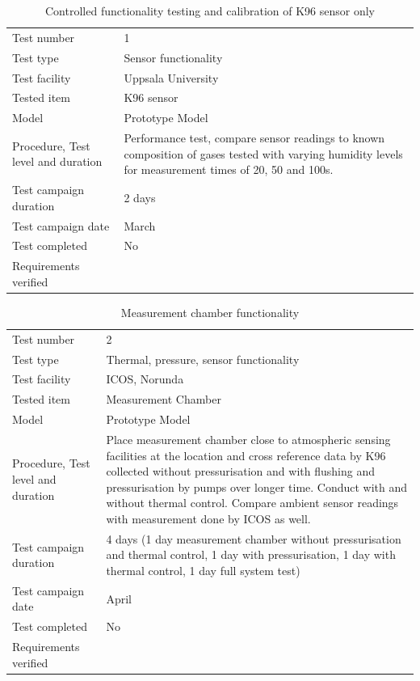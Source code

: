 \documentclass[12pt,a4paper]{report}
\begin{document}
\begin{table}[h]
\centering
\caption{Controlled functionality testing and calibration of K96 sensor only}
\label{tab:test1}
\begin{tabular}{L{5cm}L{10cm}}
\toprule
Test number & 1 \\
Test type & Sensor functionality \\
Test facility & Uppsala University \\
Tested item & K96 sensor \\
Model & Prototype Model \\
Procedure, Test level and duration & Performance test, compare sensor readings to known composition of gases tested with varying humidity levels for measurement times of 20, 50 and 100s. \\
Test campaign duration & 2 days \\
Test campaign date & March \\
Test completed & No \\
Requirements verified & \\
\bottomrule
\end{tabular}
\end{table}

\begin{table}[H]
\centering
\caption{Measurement chamber functionality}
\label{tab:test2}
\begin{tabular}{L{5cm}L{10cm}}
\toprule
Test number & 2 \\
Test type & Thermal, pressure, sensor functionality \\
Test facility & ICOS, Norunda \\
Tested item & Measurement Chamber \\
Model & Prototype Model \\
Procedure, Test level and duration & Place measurement chamber close to atmospheric sensing facilities at the location and cross reference data by K96 collected without pressurisation and with flushing and pressurisation by pumps over longer time. Conduct with and without thermal control. Compare ambient sensor readings with measurement done by ICOS as well. \\
Test campaign duration & 4 days (1 day measurement chamber without pressurisation and thermal control, 1 day with pressurisation, 1 day with thermal control, 1 day full system test) \\
Test campaign date & April \\
Test completed & No \\
Requirements verified & \\
\bottomrule
\end{tabular}
\end{table}
\end{document}
